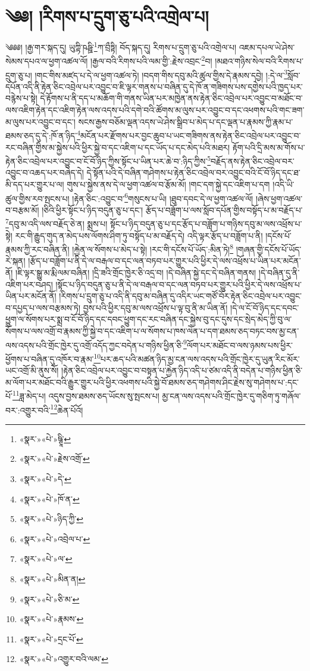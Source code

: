 \chapter{༄༅། །རིགས་པ་དྲུག་ཅུ་པའི་འགྲེལ་པ།}༄༅༅། །རྒྱ་གར་སྐད་དུ། ཡུཀྟི་ཥཥྛི་\footnote{«སྣར་»«པེ་»ཥྚཱི་}ཀ་བྲྀཏྟི། བོད་སྐད་དུ། རིགས་པ་དྲུག་ཅུ་པའི་འགྲེལ་པ། འཇམ་དཔལ་ཡེ་ཤེས་སེམས་དཔའ་ལ་ཕྱག་འཚལ་ལོ། །རྒྱལ་བའི་རིགས་པའི་ལམ་གྱི་:རྗེས་འབྲང་\footnote{«སྣར་»«པེ་»རྗེས་འགྲོ་}བ། །མཐའ་གཉིས་སེལ་བའི་རིགས་པ་དྲུག་ཅུ་པ། །གང་གིས་མཛད་པ་དེ་ལ་ཕྱག་འཚལ་ཏེ། །བདག་གིས་དབུ་མའི་ཚུལ་གྱིས་དེ་རྣམས་དབྱེ། །:དེ་ལ་\footnote{«སྣར་»«པེ་»དེ་}སློབ་དཔོན་འདི་ནི་རྟེན་ཅིང་འབྲེལ་པར་འབྱུང་བ་ཇི་ལྟར་གནས་པ་བཞིན་དུ་དེ་ཁོ་ན་གཟིགས་པས་དགྱེས་པའི་ཁྱད་པར་བརྙེས་པ་སྟེ། དེ་རྟོགས་པ་ནི་དད་པ་མཆོག་གི་གནས་ཡིན་པར་མཁྱེན་ནས་རྟེན་ཅིང་འབྲེལ་པར་འབྱུང་བ་མཐོང་བ་ལས་འཇིག་རྟེན་དང་འཇིག་རྟེན་ལས་འདས་པའི་དགེ་བའི་ཚོགས་མ་ལུས་པར་འབྱུང་བ་དང་འཕགས་པའི་གང་ཟག་མ་ལུས་པར་འབྱུང་བ་དང་། སངས་རྒྱས་བཅོམ་ལྡན་འདས་ཡེ་ཤེས་སྒྲིབ་པ་མེད་པ་དང་ལྡན་པ་རྣམས་ཀྱི་རྣམ་པ་ཐམས་ཅད་དུ་དེ་:ཁོ་ན་ཉིད་\footnote{«སྣར་»«པེ་»ཁོ་ན་}མངོན་པར་རྫོགས་པར་བྱང་ཆུབ་པ་ཡང་གཟིགས་ནས་རྟེན་ཅིང་འབྲེལ་པར་འབྱུང་བ་རང་བཞིན་གྱིས་མ་སྐྱེས་པའི་ཕྱིར་སྐྱེ་བ་དང་འཇིག་པ་དང་ཡོད་པ་དང་མེད་པའི་མཐར། རྟོག་པའི་དྲི་མས་མ་གོས་པ་རྟེན་ཅིང་འབྲེལ་པར་འབྱུང་བ་ངོ་བོ་ཉིད་ཀྱིས་སྟོང་པ་ཡིན་པར་ཆེ་བ་:ཉིད་ཀྱིས་\footnote{«སྣར་»«པེ་»ཉིད་ཀྱི་}བརྗོད་ནས་རྟེན་ཅིང་འབྲེལ་བར་འབྱུང་བ་འཆད་པར་བཞེད་དེ། དེ་སྟོན་པའི་དེ་བཞིན་གཤེགས་པ་རྟེན་ཅིང་འབྲེལ་བར་འབྱུང་བའི་ངོ་བོ་ཉིད་དང་ཐ་མི་དད་པར་གྱུར་པ་ལ། གུས་པ་སྐྱེས་ནས་དེ་ལ་ཕྱག་འཚལ་བ་རྩོམ་མོ། །གང་དག་སྐྱེ་དང་འཇིག་པ་དག །འདི་ཡི་ཚུལ་གྱིས་རབ་སྤངས་པ། །རྟེན་ཅིང་:འབྱུང་བ་\footnote{«སྣར་»«པེ་»འབྲེལ་པ་}གསུངས་པ་ཡི། །ཐུབ་དབང་དེ་ལ་ཕྱག་འཚལ་ལོ། །ཞེས་ཕྱག་འཚལ་བ་བརྩམ་མོ། །ཅིའི་ཕྱིར་སྟོང་པ་ཉིད་བདུན་ཅུ་པ་དང་། རྩོད་པ་བཟློག་པ་ལས་སློབ་དཔོན་གྱིས་བསྟོད་པ་མ་བརྗོད་པ་\footnote{«སྣར་»«པེ་»ལ་}དབུ་མ་འདི་ལས་བརྗོད་ཅེ་ན། སྨྲས་པ། སྟོང་པ་ཉིད་བདུན་ཅུ་པ་དང་རྩོད་པ་བཟློག་པ་གཉིས་དབུ་མ་ལས་འཕྲོས་པ་སྟེ། རང་གི་རྒྱུད་གུད་ན་མེད་པས་ལོགས་ཤིག་ཏུ་བསྟོད་པ་མ་བརྗོད་དེ། འདི་ལྟར་རྩོད་པ་བཟློག་པ་ནི། །དངོས་པོ་རྣམས་ཀྱི་རང་བཞིན་ནི། །རྐྱེན་ལ་སོགས་པ་མེད་པ་སྟེ། །རང་གི་དངོས་པོ་ཡོད་:མིན་ཏེ།\footnote{«སྣར་»«པེ་»མིན་ན།} །གཞན་གྱི་དངོས་པོ་ཡོད་རེ་སྐན། །རྩོད་པ་བཟློག་པ་ནི་དེ་ལ་བརྒལ་བ་དང་ལན་བཏབ་པར་གྱུར་པའི་ཕྱིར་དེ་ལས་འཕྲོས་པ་ཡིན་པར་མངོན་ནོ། །ཇི་ལྟར་སྒྱུ་མ་རྨི་ལམ་བཞིན། །དྲི་ཟའི་གྲོང་ཁྱེར་ཅི་འདྲ་བ། །དེ་བཞིན་སྐྱེ་དང་དེ་བཞིན་གནས། །དེ་བཞིན་དུ་ནི་འཇིག་པར་བཤད། །སྟོང་པ་ཉིད་བདུན་ཅུ་པ་ནི་དེ་ལ་བརྒལ་བ་དང་ལན་བཏབ་པར་གྱུར་པའི་ཕྱིར་དེ་ལས་འཕྲོས་པ་ཡིན་པར་མངོན་ནོ། །རིགས་པ་དྲུག་ཅུ་པ་འདི་ནི་དབུ་མ་བཞིན་དུ་འདིར་ཡང་གཙོ་བོར་རྟེན་ཅིང་འབྲེལ་པར་འབྱུང་བ་དཔྱད་པ་ལས་བརྩམས་ཏེ། བྱས་པའི་ཕྱིར་དབུ་མ་ལས་འཕྲོས་པ་ལྟ་བུ་ནི་མ་ཡིན་ནོ། །དེ་ལ་ངོ་བོ་ཉིད་དང་དབང་ཕྱུག་ལ་སོགས་པར་སྨྲ་བ་ངོ་བོ་ཉིད་དང་དབང་ཕྱུག་དང་རང་བཞིན་དང་སྐྱེས་བུ་དང་དུས་དང་སྲེད་མེད་ཀྱི་བུ་ལ་སོགས་པ་ལས་འགྲོ་བ་རྣམས་ཀྱི་སྐྱེ་བ་དང་འཇིག་པ་ལ་སོགས་པ་ཁས་ལེན་པ་དག་ཐམས་ཅད་བཏང་བས་མྱ་ངན་ལས་འདས་པའི་གྲོང་ཁྱེར་དུ་འགྲོ་འདོད་ཀྱང་བདེན་པ་གཉིས་ཕྱིན་ཅི་\footnote{«སྣར་»«པེ་»ཅི་མ་}ལོག་པར་མཐོང་བ་ལས་ཉམས་པས་ཕྱིར་ཕྱོགས་པ་བཞིན་དུ་འཁོར་བ་རྣམ་\footnote{«སྣར་»«པེ་»རྣམས་}པར་ཆད་པའི་མཚན་ཉིད་མྱ་ངན་ལས་འདས་པའི་གྲོང་ཁྱེར་དུ་ཡུན་རིང་མོར་ཡང་འགྲོ་མི་ནུས་སོ། །རྟེན་ཅིང་འབྲེལ་པར་འབྱུང་བ་བསྟན་པ་རྐྱེན་ཉིད་འདི་པ་ཙམ་འདི་ནི་བདེན་པ་གཉིས་ཕྱིན་ཅི་མ་ལོག་པར་མཐོང་བའི་རྒྱུར་གྱུར་པའི་ཕྱིར་འཕགས་པའི་སྐྱེ་བོ་ཐམས་ཅད་གཤེགས་ཤིང་རྗེས་སུ་གཤེགས་པ་:དང་པོ་\footnote{«སྣར་»«པེ་»དྲང་པོ་}ཟླ་མེད་པ། འདུས་བྱས་ཐམས་ཅད་ཡོངས་སུ་སྤངས་པ། མྱ་ངན་ལས་འདས་པའི་གྲོང་ཁྱེར་དུ་གཅིག་ཏུ་གཞོལ་བར་:འགྱུར་བའི་\footnote{«སྣར་»«པེ་»འགྱུར་བའི་ལམ་}ཆེན་པོའོ། 